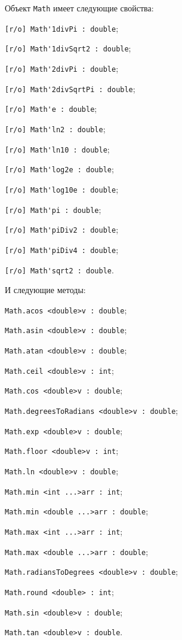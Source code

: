 Объект \lstinline|Math| имеет следующие свойства:
\begin{icItems}
	\item \lstinline|[r/o] Math'1divPi : double|;
	\item \lstinline|[r/o] Math'1divSqrt2 : double|;
	\item \lstinline|[r/o] Math'2divPi : double|;
	\item \lstinline|[r/o] Math'2divSqrtPi : double|;
	\item \lstinline|[r/o] Math'e : double|;
	\item \lstinline|[r/o] Math'ln2 : double|;
	\item \lstinline|[r/o] Math'ln10 : double|;
	\item \lstinline|[r/o] Math'log2e : double|;
	\item \lstinline|[r/o] Math'log10e : double|;
	\item \lstinline|[r/o] Math'pi : double|;
	\item \lstinline|[r/o] Math'piDiv2 : double|;
	\item \lstinline|[r/o] Math'piDiv4 : double|;
	\item \lstinline|[r/o] Math'sqrt2 : double|.
\end{icItems}

И следующие методы:
\begin{icItems}
	\item \lstinline|Math.acos <double>v : double|;
	\item \lstinline|Math.asin <double>v : double|;
	\item \lstinline|Math.atan <double>v : double|;
	\item \lstinline|Math.ceil <double>v : int|;
	\item \lstinline|Math.cos <double>v : double|;
	\item \lstinline|Math.degreesToRadians <double>v : double|;
	\item \lstinline|Math.exp <double>v : double|;
	\item \lstinline|Math.floor <double>v : int|;
	\item \lstinline|Math.ln <double>v : double|;
	\item \lstinline|Math.min <int ...>arr : int|;
	\item \lstinline|Math.min <double ...>arr : double|;
	\item \lstinline|Math.max <int ...>arr : int|;
	\item \lstinline|Math.max <double ...>arr : double|;
	\item \lstinline|Math.radiansToDegrees <double>v : double|;
	\item \lstinline|Math.round <double> : int|;
	\item \lstinline|Math.sin <double>v : double|;
	\item \lstinline|Math.tan <double>v : double|.
\end{icItems}

